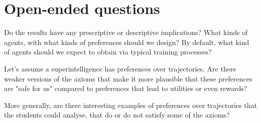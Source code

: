 \documentclass[11pt]{article}
\begin{document}
\section*{Open-ended questions}

\begin{exercise}
\label{ex:open-implications}
Do the results have any prescriptive or descriptive implications? What kinds of agents, with what kinds of preferences should we design? By default, what kind of agents should we expect to obtain via typical training processes?
\end{exercise}

\begin{exercise}
\label{ex:open-weaker-axioms}
Let's assume a superintelligence has preferences over trajectories. Are there weaker versions of the axioms that make it more plausible that these preferences are "safe for us" compared to preferences that lead to utilities or even rewards?
\end{exercise}

\begin{exercise}
\label{ex:open-examples}
More generally, are there interesting examples of preferences over trajectories that the students could analyse, that do or do not satisfy some of the axioms?
\end{exercise}


\begin{pdfonly}
\end{pdfonly}
\end{document}
